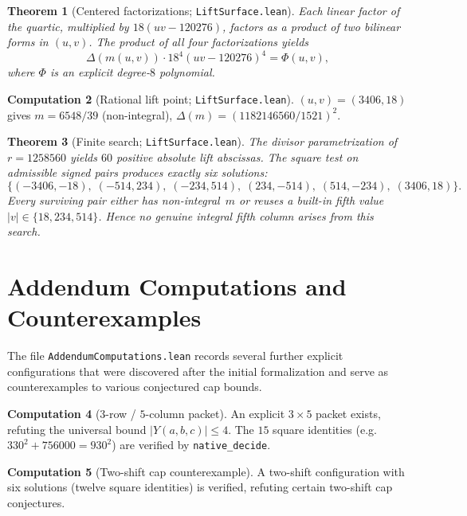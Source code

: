 \documentclass[11pt,a4paper]{article}
\newtheorem{theorem}{Theorem}[section]
\theoremstyle{definition}
\newtheorem{computation}[theorem]{Computation}
\theoremstyle{remark}
\newcommand{\abs}[1]{\lvert #1\rvert}
\begin{document}
\begin{theorem}[Centered factorizations; \texttt{LiftSurface.lean}]
Each linear factor of the quartic, multiplied by $18(uv-120276)$,
factors as a product of two bilinear forms in $(u,v)$.  The product of
all four factorizations yields
\[
  \Delta(m(u,v))\cdot 18^4(uv-120276)^4 = \Phi(u,v),
\]
where $\Phi$ is an explicit degree-$8$ polynomial.
\end{theorem}

\begin{computation}[Rational lift point; \texttt{LiftSurface.lean}]
$(u,v)=(3406,18)$ gives $m=6548/39$ (non-integral),
$\Delta(m)=(1182146560/1521)^2$.
\end{computation}

\begin{theorem}[Finite search; \texttt{LiftSurface.lean}]
The divisor parametrization of $r=1258560$ yields $60$ positive
absolute lift abscissas.  The square test on admissible signed pairs
produces exactly six solutions:
\[
  \{(-3406,-18),\;(-514,234),\;(-234,514),\;(234,-514),\;(514,-234),\;(3406,18)\}.
\]
Every surviving pair either has non-integral~$m$ or reuses a built-in
fifth value $\abs{v}\in\{18,234,514\}$.  Hence no genuine integral fifth
column arises from this search.
\end{theorem}

\section{Addendum Computations and Counterexamples}\label{sec:addendum}

The file \texttt{AddendumComputations.lean} records several further
explicit configurations that were discovered after the initial
formalization and serve as counterexamples to various conjectured cap
bounds.

\begin{computation}[$3$-row / $5$-column packet]
An explicit $3\times 5$ packet exists, refuting the universal bound
$\lvert Y(a,b,c)\rvert\le 4$.  The $15$ square identities
(e.g.\ $330^2+756000=930^2$) are verified by \texttt{native\_decide}.
\end{computation}

\begin{computation}[Two-shift cap counterexample]
A two-shift configuration with six solutions (twelve square identities)
is verified, refuting certain two-shift cap conjectures.
\end{computation}
\end{document}
